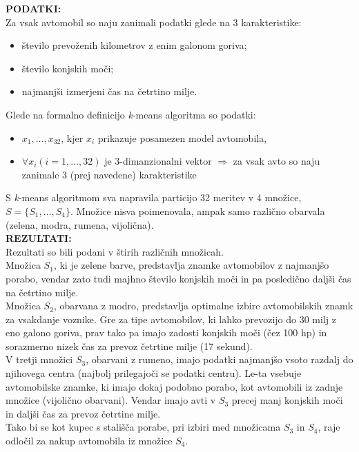 \documentclass[11pt, a4paper]{article}
\begin{document}
\vspace{0.5 cm}

\noindent \textbf{PODATKI:} \\
\noindent Za vsak avtomobil so naju zanimali podatki glede na 3 karakteristike: \\
\begin{itemize}
	\item število prevoženih kilometrov z enim galonom goriva;
	\item število konjskih moči;
	\item najmanjši izmerjeni čas na četrtino milje.
\end{itemize}

\noindent Glede na formalno definicijo \textsl{k}-means algoritma so podatki: \\
\begin{itemize}
	\item $ x_1,…,x_{32}$, kjer $x_i$ prikazuje posamezen model avtomobila, \\
	\item $\forall x_i  (i = 1,\ldots, 32)$ je 3-dimanzionalni vektor $\Rightarrow$ za vsak avto so naju zanimale 3 (prej navedene) karakteristike \\
\end{itemize}
S \textsl{k}-means algoritmom sva napravila particijo 32 meritev v 4 množice, \\ 
$ S = \{S_1, \ldots, S_4\}$.  Množice nisva poimenovala, ampak samo različno obarvala (zelena, modra, rumena, vijolična). \\

\noindent \textbf{REZULTATI:} \\
\noindent Rezultati so bili podani v štirih različnih množicah.  \\
\noindent Množica $S_1$, ki je zelene barve, predstavlja znamke avtomobilov z najmanjšo porabo, vendar zato tudi majhno število konjskih moči in pa posledično daljši čas na četrtino milje. \\
\noindent Množica $S_2$, obarvana z modro, predstavlja optimalne izbire avtomobilskih znamk za vsakdanje voznike. Gre za tipe avtomobilov, ki lahko prevozijo do 30 milj z eno galono goriva, prav tako pa imajo zadosti konjskih moči (čez 100 hp) in sorazmerno nizek čas za prevoz četrtine milje (17 sekund). \\
\noindent V tretji množici $S_3$, obarvani z rumeno, imajo podatki najmanjšo vsoto razdalj do njihovega centra (najbolj prilegajoči se podatki centru). Le-ta vsebuje avtomobilske znamke, ki imajo dokaj podobno porabo, kot avtomobili iz zadnje množice (vijolično obarvani). Vendar imajo avti v $S_3$ precej manj konjskih moči in daljši čas za prevoz četrtine milje. \\
\noindent Tako bi se kot kupec s stališča porabe, pri izbiri med množicama $S_3$ in $S_4$, raje odločil za nakup avtomobila iz množice $S_4$.
\end{document}

